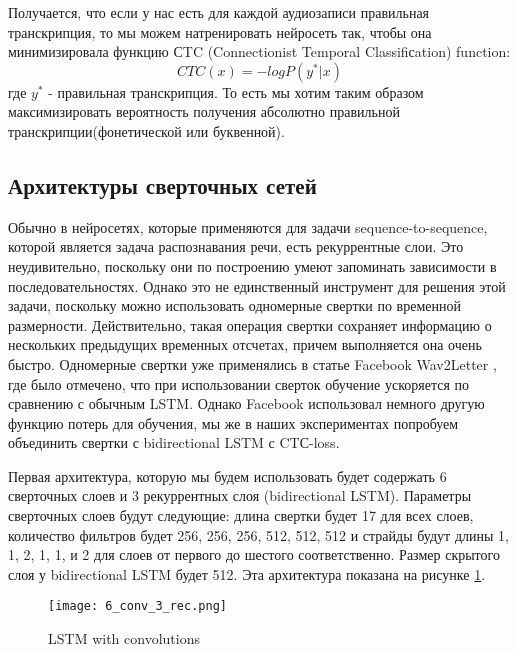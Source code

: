 \documentclass[a4paper,14pt]{extarticle}
\begin{document}
Получается, что если у нас есть для каждой аудиозаписи правильная транскрипция, то мы можем натренировать нейросеть так, чтобы она минимизировала функцию СTC (Connectionist Temporal Classifiсation) function:
$$CTC(x) = - log P(y^* | x)$$
где $y^*$ - правильная транскрипция.
То есть мы хотим таким образом максимизировать вероятность получения абсолютно правильной транскрипции(фонетической или буквенной).

\subsection{Архитектуры сверточных сетей}
Обычно в нейросетях, которые применяются для задачи sequence-to-sequence, которой является задача распознавания речи, есть рекуррентные слои. Это неудивительно, поскольку они по построению умеют запоминать зависимости в последовательностях. Однако это не единственный инструмент для решения этой задачи, поскольку можно использовать одномерные свертки по временной размерности. Действительно, такая операция свертки сохраняет информацию о нескольких предыдущих временных отсчетах, причем выполняется она очень быстро. Одномерные свертки уже применялись в статье Facebook Wav2Letter \cite{facebook}, где было отмечено, что при использовании сверток обучение ускоряется по сравнению с обычным LSTM. Однако Facebook использовал немного другую функцию потерь для обучения, мы же в наших экспериментах попробуем объединить свертки с bidirectional LSTM с CTС-loss. 

Первая архитектура, которую мы будем использовать будет содержать 6 сверточных слоев и 3 рекуррентных слоя (bidirectional LSTM). Параметры сверточных слоев будут следующие: длина свертки будет 17 для всех слоев, количество фильтров будет 256, 256, 256, 512, 512, 512 и страйды будут длины 1, 1, 2, 1, 1, и 2 для слоев от первого до шестого соответственно. Размер скрытого слоя у bidirectional LSTM будет 512. Эта архитектура показана на рисунке \ref{6conv_3rec}.
\begin{figure}[!h]
	\centering
	\texttt{[image: 6\_conv\_3\_rec.png]}%
	\caption{LSTM with convolutions}
	\label{6conv_3rec}
\end{figure}
\end{document}

